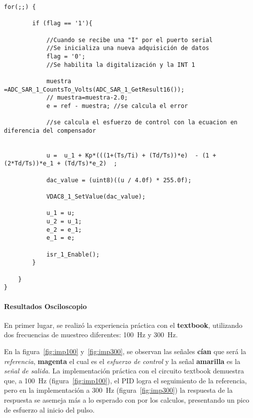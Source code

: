 \begin{minipage}{0.98\textwidth}
\begin{lstlisting}[style=cstyle,caption={Código completo del PSoC},label={lst:c}]
	for(;;) {
		
		if (flag == '1'){
			
			//Cuando se recibe una "I" por el puerto serial
			//Se inicializa una nueva adquisición de datos
			flag = '0'; 
			//Se habilita la digitalización y la INT 1   
			
			muestra =ADC_SAR_1_CountsTo_Volts(ADC_SAR_1_GetResult16());
			// muestra=muestra-2.0;
			e = ref - muestra; //se calcula el error
			
			//se calcula el esfuerzo de control con la ecuacion en diferencia del compensador
			
			
			u =  u_1 + Kp*(((1+(Ts/Ti) + (Td/Ts))*e)  - (1 +(2*Td/Ts))*e_1 + (Td/Ts)*e_2)  ; 
			
			dac_value = (uint8)((u / 4.0f) * 255.0f);
			
			VDAC8_1_SetValue(dac_value);           
			
			u_1 = u;
			u_2 = u_1;
			e_2 = e_1;
			e_1 = e;
			
			isr_1_Enable();
		}
		
	}
}
\end{lstlisting}
\end{minipage}
\twocolumn
\paragraph{Resultados Osciloscopio}
En primer lugar, se realizó la experiencia práctica con el \textbf{textbook}, utilizando dos frecuencias de muestreo diferentes: \SI{100}{\hertz} y \SI{300}{\hertz}.

En la figura~\ref{fig:imp100} y~\ref{fig:imp300}, se observan las señales \textbf{cían} que será la \textit{referencia}, \textbf{magenta} el cual es el \textit{esfuerzo de control} y la señal \textbf{amarilla} es la \textit{señal de salida}. \hfill \break
La implementación práctica con el circuito textbook demuestra que, a \SI{100}{\hertz} (figura~\ref{fig:imp100}), el PID logra el seguimiento de la referencia, pero en la implementación a \SI{300}{\hertz} (figura~\ref{fig:imp300}) la respuesta de la respuesta se asemeja más a lo esperado con por los calculos, presentando un pico de esfuerzo al inicio del pulso.


